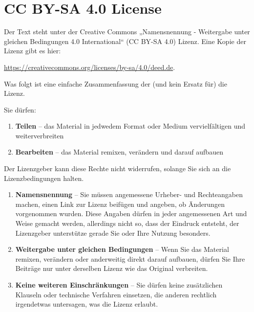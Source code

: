 \documentclass{tufte-handout}
\begin{document}
\clearpage

\section*{CC BY-SA 4.0 License}

\begin{fullwidth}

Der Text steht unter der Creative Commons „Namensnennung - Weitergabe
unter gleichen Bedingungen 4.0 International“ (CC BY-SA 4.0) Lizenz.
Eine Kopie der Lizenz gibt es hier:

\href{https://creativecommons.org/licenses/by-sa/4.0/}{https://creativecommons.org/licenses/by-sa/4.0/deed.de}.

\medskip\noindent Was folgt ist eine einfache Zusammenfassung der (und
kein Ersatz für) die Lizenz.

\medskip\noindent Sie dürfen:

\begin{enumerate}

\item \textbf{Teilen} – das Material in jedwedem Format oder Medium
  vervielfältigen und weiterverbreiten

\item \textbf{Bearbeiten} – das Material remixen, verändern und darauf
  aufbauen

\end{enumerate}

\noindent Der Lizenzgeber kann diese Rechte nicht widerrufen, solange
Sie sich an die Lizenzbedingungen halten.

\begin{enumerate}

\item \textbf{Namensnennung} – Sie müssen angemessene Urheber- und
  Rechteangaben machen, einen Link zur Lizenz beifügen und angeben, ob
  Änderungen vorgenommen wurden. Diese Angaben dürfen in jeder
  angemessenen Art und Weise gemacht werden, allerdings nicht so, dass
  der Eindruck entsteht, der Lizenzgeber unterstütze gerade Sie oder
  Ihre Nutzung besonders.

\item \textbf{Weitergabe unter gleichen Bedingungen} – Wenn Sie das
  Material remixen, verändern oder anderweitig direkt darauf aufbauen,
  dürfen Sie Ihre Beiträge nur unter derselben Lizenz wie das Original
  verbreiten.

\item \textbf{Keine weiteren Einschränkungen} – Sie dürfen keine
  zusätzlichen Klauseln oder technische Verfahren einsetzen, die
  anderen rechtlich irgendetwas untersagen, was die Lizenz erlaubt.


\end{enumerate}
\end{fullwidth}
\end{document}
